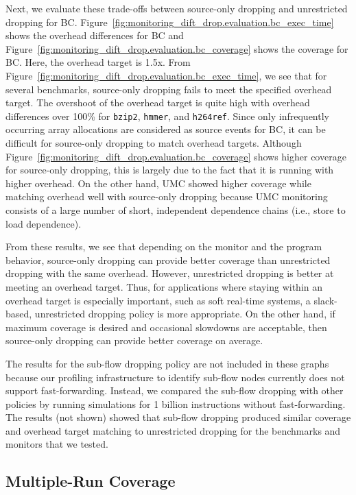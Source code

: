 Next, we evaluate these trade-offs between source-only dropping and
unrestricted dropping for BC.
Figure~\ref{fig:monitoring_dift_drop.evaluation.bc_exec_time} shows the
overhead differences for BC and
Figure~\ref{fig:monitoring_dift_drop.evaluation.bc_coverage} shows the coverage
for BC.  Here, the overhead target is 1.5x.  From
Figure~\ref{fig:monitoring_dift_drop.evaluation.bc_exec_time}, we see that for
several benchmarks, source-only dropping fails to meet the specified overhead
target.  The overshoot of the overhead target is quite high with overhead
differences over 100\% for {\tt bzip2}, {\tt hmmer}, and {\tt h264ref}.  Since
only infrequently occurring array allocations are considered as source events
for BC, it can be difficult for source-only dropping to match overhead targets.
Although Figure~\ref{fig:monitoring_dift_drop.evaluation.bc_coverage} shows
higher coverage for source-only dropping, this is largely due to the fact that
it is running with higher overhead.
On the other hand, UMC showed higher coverage while matching overhead well with
source-only dropping because UMC monitoring consists of a large number of short,
independent dependence chains (i.e., store to load dependence).

From these results, we see that depending on the monitor and the program
behavior, source-only dropping can provide better coverage than unrestricted
dropping with the same overhead. However, unrestricted dropping is better at
meeting an overhead target.  Thus, for applications where staying within an
overhead target is especially important, such as soft real-time systems, a
slack-based, unrestricted dropping policy is more appropriate. On the other
hand, if maximum coverage is desired and occasional slowdowns are acceptable,
then source-only dropping can provide better coverage on average.

The results for the sub-flow dropping policy are not included in these graphs
because our profiling infrastructure to identify sub-flow nodes currently does
not support fast-forwarding. Instead, we compared the sub-flow dropping with
other policies by running simulations for 1 billion instructions without
fast-forwarding. The results (not shown) showed that sub-flow dropping produced
similar coverage and overhead target matching to unrestricted dropping for the
benchmarks and monitors that we tested.

\subsection{Multiple-Run Coverage}

